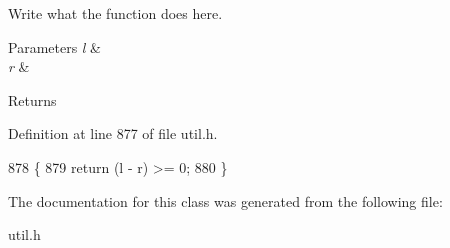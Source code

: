 Write what the function does here. 


\begin{DoxyParams}{Parameters}
{\em l} & \\
\hline
{\em r} & \\
\hline
\end{DoxyParams}
\begin{DoxyReturn}{Returns}

\end{DoxyReturn}


Definition at line 877 of file util.\+h.


\begin{DoxyCode}
878         \{
879             \textcolor{keywordflow}{return} (l - r) >= 0;
880         \}
\end{DoxyCode}


The documentation for this class was generated from the following file\+:\begin{DoxyCompactItemize}
\item 
util.\+h\end{DoxyCompactItemize}
